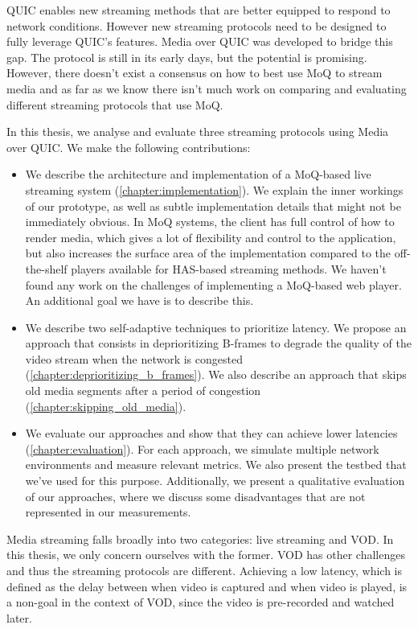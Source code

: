 QUIC enables new streaming methods that are better equipped to respond to network conditions. However new streaming protocols need to be designed to fully leverage QUIC's features. Media over QUIC was developed to bridge this gap. The protocol is still in its early days, but the potential is promising. However, there doesn't exist a consensus on how to best use MoQ to stream media and as far as we know there isn't much work on comparing and evaluating different streaming protocols that use MoQ.

In this thesis, we analyse and evaluate three streaming protocols using Media over QUIC. We make the following contributions:
\begin{itemize}
    \item We describe the architecture and implementation of a MoQ-based live streaming system (\autoref{chapter:implementation}). We explain the inner workings of our prototype, as well as subtle implementation details that might not be immediately obvious. In MoQ systems, the client has full control of how to render media, which gives a lot of flexibility and control to the application, but also increases the surface area of the implementation compared to the off-the-shelf players available for HAS-based streaming methods. %
    We haven't found any work on the challenges of implementing a MoQ-based web player. An additional goal we have is to describe this.
    \item We describe two self-adaptive techniques to prioritize latency. We propose an approach that consists in deprioritizing B-frames to degrade the quality of the video stream when the network is congested (\ref{chapter:deprioritizing_b_frames}). We also describe an approach that skips old media segments after a period of congestion (\ref{chapter:skipping_old_media}).
    \item We evaluate our approaches and show that they can achieve lower latencies (\ref{chapter:evaluation}). For each approach, we simulate multiple network environments and measure relevant metrics. We also present the testbed that we've used for this purpose. Additionally, we present a qualitative evaluation of our approaches, where we discuss some disadvantages that are not represented in our measurements.
\end{itemize}

Media streaming falls broadly into two categories: live streaming and \ac{VOD}. In this thesis, we only concern ourselves with the former. VOD has other challenges and thus the streaming protocols are different. Achieving a low latency, which is defined as the delay between when video is captured and when video is played, is a non-goal in the context of \ac{VOD}, since the video is pre-recorded and watched later.

